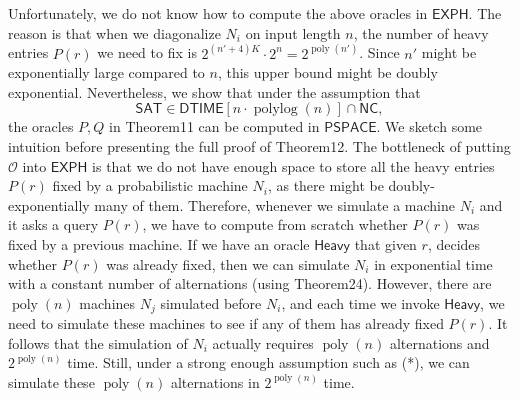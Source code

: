 \documentclass[10pt,a4paper]{article}
\begin{document}
Unfortunately, we do not know how to compute the above oracles in $\mathsf{EXPH}$. The reason is that when we diagonalize $N_i$ on input length $n$, the number of heavy entries $P(r)$ we need to fix is $2^{(n'+4)K}\cdot2^n=2^{\operatorname{poly}(n')}$. Since $n'$ might be exponentially large compared to $n$, this upper bound might be doubly exponential. Nevertheless, we show that under the assumption that
\[\mathsf{SAT}\in\mathsf{DTIME}[n\cdot\operatorname{polylog}(n)]\cap\mathsf{NC},\tag{*}\]
the oracles $P,Q$ in Theorem11 can be computed in $\mathsf{PSPACE}$.
We sketch some intuition before presenting the full proof of Theorem12. The bottleneck of putting $\mathcal O$ into $\mathsf{EXPH}$ is that we do not have enough space to store all the heavy entries $P(r)$ fixed by a probabilistic machine $N_i$, as there might be doubly-exponentially many of them. Therefore, whenever we simulate a machine $N_i$ and it asks a query $P(r)$, we have to compute from scratch whether $P(r)$ was fixed by a previous machine. If we have an oracle $\mathsf{Heavy}$ that given $r$, decides whether $P(r)$ was already fixed, then we can simulate $N_i$ in exponential time with a constant number of alternations (using Theorem24). However, there are $\operatorname{poly}(n)$ machines $N_j$ simulated before $N_i$, and each time we invoke $\mathsf{Heavy}$, we need to simulate these machines to see if any of them has already fixed $P(r)$. It follows that the simulation of $N_i$ actually requires $\operatorname{poly}(n)$ alternations and $2^{\operatorname{poly}(n)}$ time. Still, under a strong enough assumption such as (*), we can simulate these $\operatorname{poly}(n)$ alternations in $2^{\operatorname{poly}(n)}$ time.
\end{document}
